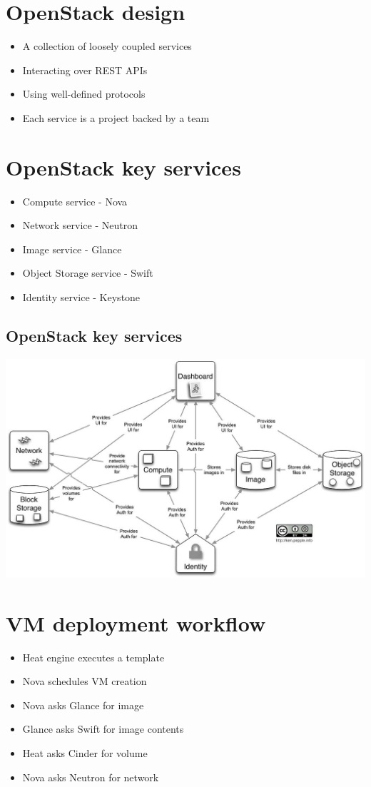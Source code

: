 \documentclass[11pt]{article}
\begin{document}
\section*{OpenStack design}
\label{sec:org1d56560}
\begin{itemize}
\item A collection of loosely coupled services
\item Interacting over REST APIs
\item Using well-defined protocols
\item Each service is a project backed by a team
\end{itemize}

\section*{OpenStack key services}
\label{sec:org2a6af14}
\begin{itemize}
\item Compute service - Nova
\item Network service - Neutron
\item Image service - Glance
\item Object Storage service - Swift
\item Identity service - Keystone
\end{itemize}

\subsection*{OpenStack key services}
\label{sec:org53a5d33}
\begin{center}
\includegraphics[width=.9\linewidth]{./openstack.jpg}
\end{center}

\section*{VM deployment workflow}
\label{sec:orge1cdd67}
\begin{itemize}
\item Heat engine executes a template
\item Nova schedules VM creation
\item Nova asks Glance for image
\item Glance asks Swift for image contents
\item Heat asks Cinder for volume
\item Nova asks Neutron for network
\end{itemize}
\end{document}
